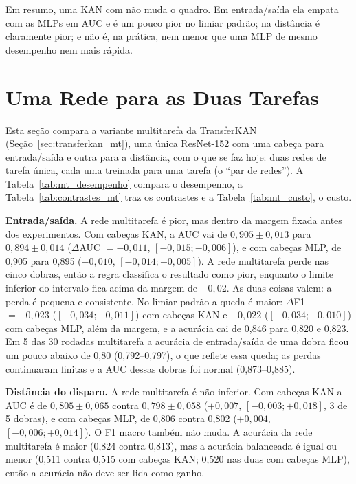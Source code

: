 Em resumo, uma KAN com  não muda o quadro. Em entrada/saída ela empata com as MLPs em AUC e é um pouco pior no limiar padrão; na distância é claramente pior; e não é, na prática, nem menor que uma MLP de mesmo desempenho nem mais rápida.

\section{Uma Rede para as Duas Tarefas}
\label{sec:res_mt}

Esta seção compara a variante multitarefa da TransferKAN (Seção~\ref{sec:transferkan_mt}), uma única ResNet-152 com uma cabeça para entrada/saída e outra para a distância, com o que se faz hoje: duas redes de tarefa única, cada uma treinada para uma tarefa (o ``par de redes''). A Tabela~\ref{tab:mt_desempenho} compara o desempenho, a Tabela~\ref{tab:contrastes_mt} traz os contrastes e a Tabela~\ref{tab:mt_custo}, o custo.



\textbf{Entrada/saída.} A rede multitarefa é pior, mas dentro da margem fixada antes dos experimentos. Com cabeças KAN, a AUC vai de $0{,}905 \pm 0{,}013$ para $0{,}894 \pm 0{,}014$ ($\Delta$AUC $= -0{,}011$, $[-0{,}015; -0{,}006]$), e com cabeças MLP, de 0,905 para 0,895 ($-0{,}010$, $[-0{,}014; -0{,}005]$). A rede multitarefa perde nas cinco dobras, então a regra classifica o resultado como pior, enquanto o limite inferior do intervalo fica acima da margem de $-0{,}02$. As duas coisas valem: a perda é pequena e consistente. No limiar padrão a queda é maior: $\Delta$F1 $= -0{,}023$ ($[-0{,}034; -0{,}011]$) com cabeças KAN e $-0{,}022$ ($[-0{,}034; -0{,}010]$) com cabeças MLP, além da margem, e a acurácia cai de 0,846 para 0,820 e 0,823. Em 5 das 30 rodadas multitarefa a acurácia de entrada/saída de uma dobra ficou um pouco abaixo de 0,80 (0,792--0,797), o que reflete essa queda; as perdas continuaram finitas e a AUC dessas dobras foi normal (0,873--0,885).

\textbf{Distância do disparo.} A rede multitarefa é não inferior. Com cabeças KAN a AUC é de $0{,}805 \pm 0{,}065$ contra $0{,}798 \pm 0{,}058$ ($+0{,}007$, $[-0{,}003; +0{,}018]$, 3 de 5 dobras), e com cabeças MLP, de 0,806 contra 0,802 ($+0{,}004$, $[-0{,}006; +0{,}014]$). O F1 macro também não muda. A acurácia da rede multitarefa é maior (0,824 contra 0,813), mas a acurácia balanceada é igual ou menor (0,511 contra 0,515 com cabeças KAN; 0,520 nas duas com cabeças MLP), então a acurácia não deve ser lida como ganho.

